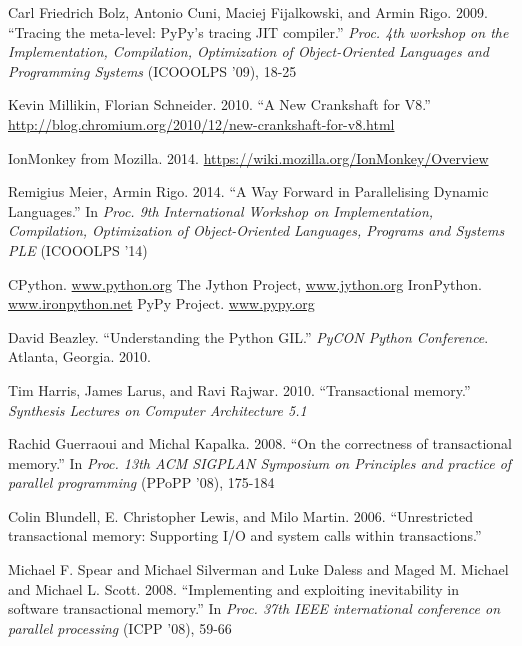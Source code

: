 \documentclass{sigplanconf}
\begin{document}
\begin{thebibliography}{}
\softraggedright

 Carl Friedrich Bolz, Antonio Cuni, Maciej
  Fijalkowski, and Armin Rigo. 2009. ``Tracing the meta-level: PyPy's
  tracing JIT compiler.''  \emph{Proc. 4th workshop on the
    Implementation, Compilation, Optimization of Object-Oriented Languages
    and Programming Systems} (ICOOOLPS '09), 18-25

 Kevin Millikin, Florian Schneider. 2010.  ``A New
  Crankshaft for V8.''
  \url{http://blog.chromium.org/2010/12/new-crankshaft-for-v8.html}

 IonMonkey from Mozilla. 2014.
  \url{https://wiki.mozilla.org/IonMonkey/Overview}

 Remigius Meier, Armin Rigo. 2014. ``A Way Forward
  in Parallelising Dynamic Languages.'' In \emph{Proc. 9th International
    Workshop on Implementation, Compilation, Optimization of Object-Oriented
    Languages, Programs and Systems PLE} (ICOOOLPS '14)

 CPython. \url{www.python.org}
 The Jython Project, \url{www.jython.org}
 IronPython. \url{www.ironpython.net}
 PyPy Project. \url{www.pypy.org}

 David Beazley. ``Understanding the Python GIL.''
  \emph{PyCON Python Conference}. Atlanta, Georgia. 2010.

 Tim Harris, James Larus, and Ravi
  Rajwar. 2010. ``Transactional memory.'' \emph{Synthesis Lectures on Computer
  Architecture 5.1}

  Rachid Guerraoui and Michal Kapalka. 2008. ``On the correctness of
  transactional memory.'' In \emph{Proc. 13th ACM SIGPLAN Symposium on
    Principles and practice of parallel programming} (PPoPP '08),
  175-184

 Colin Blundell, E. Christopher Lewis, and Milo
  Martin. 2006. ``Unrestricted transactional memory: Supporting I/O and system
  calls within transactions.''

 Michael F. Spear and Michael Silverman and Luke
  Daless and Maged M. Michael and Michael L. Scott. 2008. ``Implementing
  and exploiting inevitability in software transactional memory.''  In
  \emph{Proc. 37th IEEE international conference on parallel
    processing} (ICPP '08), 59-66


\end{thebibliography}
\end{document}
